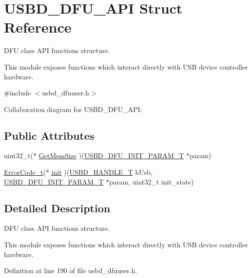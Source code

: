 \hypertarget{structUSBD__DFU__API}{}\section{U\+S\+B\+D\+\_\+\+D\+F\+U\+\_\+\+A\+PI Struct Reference}
\label{structUSBD__DFU__API}


D\+FU class A\+PI functions structure.

This module exposes functions which interact directly with U\+SB device controller hardware.  




{\ttfamily \#include $<$usbd\+\_\+dfuuser.\+h$>$}



Collaboration diagram for U\+S\+B\+D\+\_\+\+D\+F\+U\+\_\+\+A\+PI\+:
\subsection*{Public Attributes}
\begin{DoxyCompactItemize}
\item 
uint32\+\_\+t($\ast$ \hyperlink{structUSBD__DFU__API_a91b64bb4209cfa9e3254bd3ba8963cdc}{Get\+Mem\+Size} )(\hyperlink{group__USBD__DFU_ga8506b43ae2bda83cc8c459114fd3fc82}{U\+S\+B\+D\+\_\+\+D\+F\+U\+\_\+\+I\+N\+I\+T\+\_\+\+P\+A\+R\+A\+M\+\_\+T} $\ast$param)
\item 
\hyperlink{error_8h_a905255056c349318139d94aa4523d516}{Error\+Code\+\_\+t}($\ast$ \hyperlink{structUSBD__DFU__API_a88ef3b78fca066f41f8020d39163e1e8}{init} )(\hyperlink{group__USBD__Core_gafdbb2204d929cb9d75736bd2b42342ac}{U\+S\+B\+D\+\_\+\+H\+A\+N\+D\+L\+E\+\_\+T} h\+Usb, \hyperlink{group__USBD__DFU_ga8506b43ae2bda83cc8c459114fd3fc82}{U\+S\+B\+D\+\_\+\+D\+F\+U\+\_\+\+I\+N\+I\+T\+\_\+\+P\+A\+R\+A\+M\+\_\+T} $\ast$param, uint32\+\_\+t init\+\_\+state)
\end{DoxyCompactItemize}


\subsection{Detailed Description}
D\+FU class A\+PI functions structure.

This module exposes functions which interact directly with U\+SB device controller hardware. 



Definition at line 190 of file usbd\+\_\+dfuuser.\+h.



